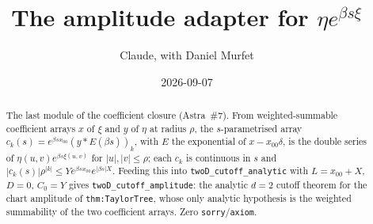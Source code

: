 \documentclass[11pt]{article}
\title{The amplitude adapter for $\eta e^{\beta s\xi}$}
\author{Claude, with Daniel Murfet}
\date{2026-09-07}
\begin{document}
\maketitle
\sloppy

\begin{abstract}
The last module of the coefficient closure (Astra~\#7). From weighted-summable coefficient arrays
$x$ of $\xi$ and $y$ of $\eta$ at radius $\rho$, the $s$-parametrised array
$c_k(s)=e^{\beta sx_{00}}(y*E(\beta s))_k$, with $E$ the exponential of $x-x_{00}\delta$, is the
double series of $\eta(u,v)e^{\beta s\xi(u,v)}$ for $|u|,|v|\le\rho$; each $c_k$ is continuous in $s$
and $|c_k(s)|\rho^{|k|}\le Y e^{\beta sx_{00}}e^{|\beta s|X}$. Feeding this into
\texttt{twoD\_cutoff\_analytic} with $L=x_{00}+X$, $D=0$, $C_0=Y$ gives
\texttt{twoD\_cutoff\_amplitude}: the analytic $d=2$ cutoff theorem for the chart amplitude of
\texttt{thm:TaylorTree}, whose only analytic hypothesis is the weighted summability of the two
coefficient arrays. Zero \texttt{sorry}/\texttt{axiom}.
\end{abstract}
\end{document}
